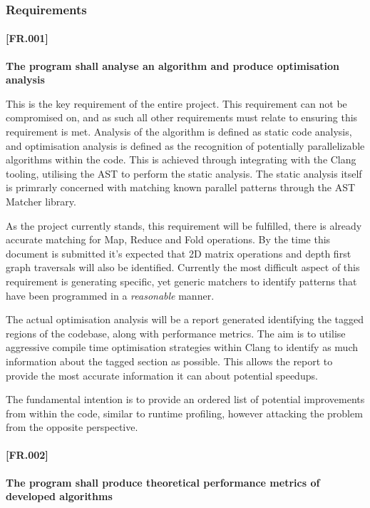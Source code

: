 \subsubsection{Requirements}

\paragraph{[FR.001]}
\textbf{The program shall analyse an algorithm and produce optimisation analysis}

This is the key requirement of the entire project. This requirement can not be compromised on, and as such all other requirements must relate to ensuring this requirement is met. Analysis of the algorithm is defined as static code analysis, and optimisation analysis is defined as the recognition of potentially parallelizable algorithms within the code. This is achieved through integrating with the Clang tooling, utilising the AST to perform the static analysis. The static analysis itself is primrarly concerned with matching known parallel patterns through the AST Matcher library. 

As the project currently stands, this requirement will be fulfilled, there is already accurate matching for Map, Reduce and Fold operations. By the time this document is submitted it's expected that 2D matrix operations and depth first graph traversals will also be identified. Currently the most difficult aspect of this requirement is generating specific, yet generic matchers to identify patterns that have been programmed in a \textit{reasonable} manner.

The actual optimisation analysis will be a report generated identifying the tagged regions of the codebase, along with performance metrics. The aim is to utilise aggressive compile time optimisation strategies within Clang to identify as much information about the tagged section as possible. This allows the report to provide the most accurate information it can about potential speedups.

The fundamental intention is to provide an ordered list of potential improvements from within the code, similar to runtime profiling, however attacking the problem from the opposite perspective.

\paragraph{[FR.002]} \label{[FR.002]}
\textbf{The program shall produce theoretical performance metrics of developed algorithms}

